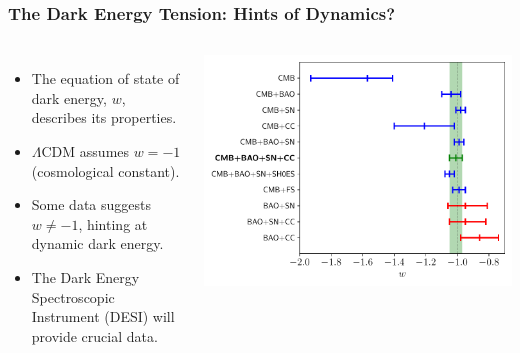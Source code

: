 \documentclass[aspectratio=169]{beamer}
\begin{document}
\begin{frame}
    \frametitle{The Dark Energy Tension: Hints of Dynamics?}
    \begin{columns}
        \begin{itemize}
            \item The equation of state of dark energy, $w$, describes its properties.
            \item $\Lambda$CDM assumes $w = -1$ (cosmological constant).
            \item Some data suggests $w \neq -1$, hinting at dynamic dark energy.  
            \item The Dark Energy Spectroscopic Instrument (DESI) will provide crucial data.
        \end{itemize}
        \includegraphics[width=\textwidth]{figures/Whisker_plot_w.pdf}
    \end{columns}
\end{frame}
\end{document}
